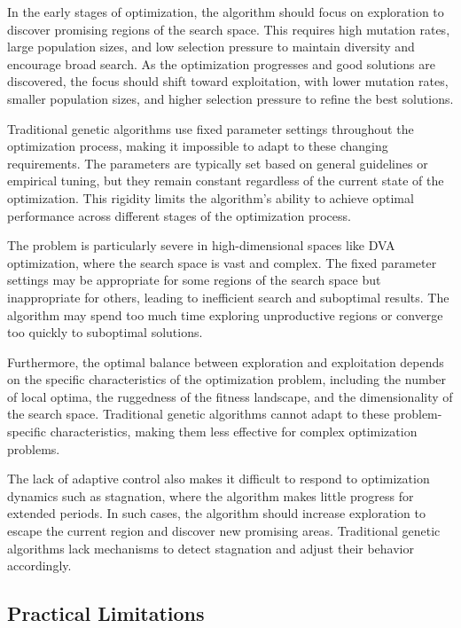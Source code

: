 \documentclass[12pt,a4paper]{article}
\begin{document}
In the early stages of optimization, the algorithm should focus on exploration to discover promising regions of the search space. This requires high mutation rates, large population sizes, and low selection pressure to maintain diversity and encourage broad search. As the optimization progresses and good solutions are discovered, the focus should shift toward exploitation, with lower mutation rates, smaller population sizes, and higher selection pressure to refine the best solutions.

Traditional genetic algorithms use fixed parameter settings throughout the optimization process, making it impossible to adapt to these changing requirements. The parameters are typically set based on general guidelines or empirical tuning, but they remain constant regardless of the current state of the optimization. This rigidity limits the algorithm's ability to achieve optimal performance across different stages of the optimization process.

The problem is particularly severe in high-dimensional spaces like DVA optimization, where the search space is vast and complex. The fixed parameter settings may be appropriate for some regions of the search space but inappropriate for others, leading to inefficient search and suboptimal results. The algorithm may spend too much time exploring unproductive regions or converge too quickly to suboptimal solutions.

Furthermore, the optimal balance between exploration and exploitation depends on the specific characteristics of the optimization problem, including the number of local optima, the ruggedness of the fitness landscape, and the dimensionality of the search space. Traditional genetic algorithms cannot adapt to these problem-specific characteristics, making them less effective for complex optimization problems.

The lack of adaptive control also makes it difficult to respond to optimization dynamics such as stagnation, where the algorithm makes little progress for extended periods. In such cases, the algorithm should increase exploration to escape the current region and discover new promising areas. Traditional genetic algorithms lack mechanisms to detect stagnation and adjust their behavior accordingly.

\subsection{Practical Limitations}
\end{document}
